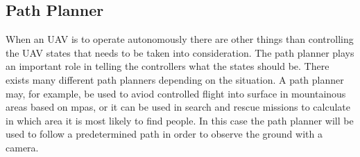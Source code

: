 \subsection{Path Planner}
When an UAV is to operate autonomously there are other things than controlling the UAV states that needs to be taken into consideration. The path planner plays an important role in telling the controllers what the states should be. There exists many different path planners depending on the situation. A path planner may, for example, be used to aviod controlled flight into surface in mountainous areas based on mpas, or it can be used in search and rescue missions to calculate in which area it is most likely to find people. In this case the path planner will be used to follow a predetermined path in order to observe the ground with a camera.